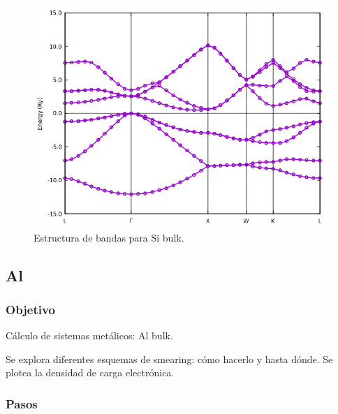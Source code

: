     \begin{figure}[H]
        \centering
        \includegraphics[scale = 0.6]{figs/D2/Si_bands.png}
        \caption{Estructura de bandas para Si bulk.}
    \end{figure}

\subsection{Al}

\subsubsection{Objetivo}

  Cálculo de sistemas metálicos: Al bulk.

  Se explora diferentes esquemas de smearing: cómo hacerlo y hasta dónde. Se plotea la densidad de carga electrónica.

\subsubsection{Pasos}

